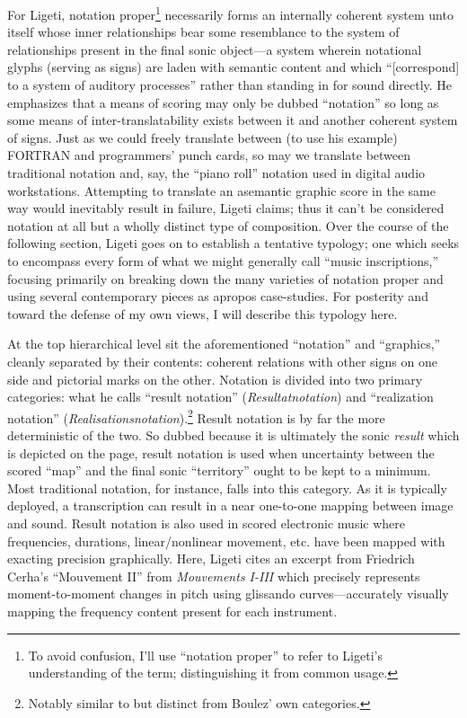    For Ligeti, notation proper\footnote{To avoid confusion, I'll use ``notation proper'' to refer to Ligeti's understanding of the term; distinguishing it from common usage.} necessarily forms an internally coherent system unto itself whose inner relationships bear some resemblance to the system of relationships present in the final sonic object---a system wherein notational glyphs (serving as signs) are laden with semantic content and which ``[correspond] to a system of auditory processes'' rather than standing in for sound directly.\autocite[171]{Ligeti_1965} He emphasizes that a means of scoring may only be dubbed ``notation'' so long as some means of inter-translatability exists between it and another coherent system of signs. Just as we could freely translate between (to use his example) FORTRAN and programmers' punch cards, so may we translate between traditional notation and, say, the ``piano roll'' notation used in digital audio workstations. Attempting to translate an asemantic graphic score in the same way would inevitably result in failure, Ligeti claims; thus it can't be considered notation at all but a wholly distinct type of composition. Over the course of the following section, Ligeti goes on to establish a tentative typology; one which seeks to encompass every form of what we might generally call ``music inscriptions,'' focusing primarily on breaking down the many varieties of notation proper and using several contemporary pieces as apropos case-studies. For posterity and toward the defense of my own views, I will describe this typology here.

    At the top hierarchical level sit the aforementioned ``notation'' and ``graphics,'' cleanly separated by their contents: coherent relations with other signs on one side and pictorial marks on the other. Notation is divided into  two primary categories: what he calls ``result notation'' (\textit{Resultatnotation}) and ``realization notation'' (\textit{Realisationsnotation}).\footnote{Notably similar to but distinct from Boulez' own categories.} Result notation is by far the more deterministic of the two. So dubbed because it is ultimately the sonic \textit{result} which is depicted on the page, result notation is used when uncertainty between the scored ``map'' and the final sonic ``territory'' ought to be kept to a minimum. Most traditional notation, for instance, falls into this category. As it is typically deployed, a transcription can result in a near one-to-one mapping between image and sound. Result notation is also used in scored electronic music where frequencies, durations, linear/nonlinear movement, etc. have been mapped with exacting precision graphically. Here, Ligeti cites an excerpt from Friedrich Cerha's ``Mouvement II'' from \textit{Mouvements I-III} which precisely represents moment-to-moment changes in pitch using glissando curves---accurately visually mapping the frequency content present for each instrument.

